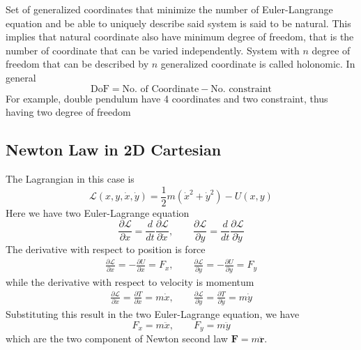 \documentclass[../../../main.tex]{subfiles}
\begin{document}
Set of generalized coordinates that minimize the number of Euler-Langrange equation and be able to uniquely describe said system is said to be natural.
This implies that natural coordinate also have minimum degree of freedom, that is the number of coordinate that can be varied independently.
System with $n$ degree of freedom that can be described by $n$ generalized coordinate is called holonomic.
In general 
\begin{equation*}
  \text{DoF}=\text{No. of Coordinate}-\text{No. constraint}
\end{equation*}
For example, double pendulum have 4 coordinates and two constraint, thus having two degree of freedom

\subsection*{Newton Law in 2D Cartesian}
The Lagrangian in this case is 
\begin{equation*}
  \mathcal{L}(x,y,\dot{x},\dot{y})=\frac{1}{2}m(\dot{x}^2+\dot{y}^2)-U(x,y)
\end{equation*}
Here we have two Euler-Lagrange equation
\begin{equation*}
  \frac{\partial \mathcal{L}}{\partial x}=\frac{d}{dt}\frac{\partial \mathcal{L}}{\partial \dot{x}},\qquad
  \frac{\partial \mathcal{L}}{\partial y}=\frac{d}{dt}\frac{\partial \mathcal{L}}{\partial \dot{y}}
\end{equation*}
The derivative with respect to position is force
\begin{align*}
  \frac{\partial \mathcal{L}}{\partial x}=-\frac{\partial U}{\partial x}=F_x,\qquad
  \frac{\partial \mathcal{L}}{\partial y}=-\frac{\partial U}{\partial y}=F_y
\end{align*}
while the derivative with respect to velocity is momentum
\begin{align*}
  \frac{\partial\mathcal{L}}{\partial \dot{x}}=\frac{\partial T}{\partial \dot{x}}=m\dot{x}, \qquad
  \frac{\partial\mathcal{L}}{\partial \dot{y}}=\frac{\partial T}{\partial \dot{y}}=m\dot{y}
\end{align*}
Substituting this result in the two Euler-Lagrange equation, we have 
\begin{equation*}
  F_x=m\ddot{x},\qquad F_y=m\ddot{y}
\end{equation*}
which are the two component of Newton second law $\mathbf{F}=m\mathbf{\ddot{r}}$.
\end{document}
